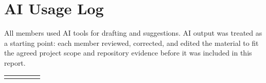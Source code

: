 \clearpage
\section{AI Usage Log}\label{ai-usage-log}

All members used AI tools for drafting and suggestions. AI output was treated
as a starting point: each member reviewed, corrected, and edited the material
to fit the agreed project scope and repository evidence before it was included
in this report.

\begin{longtable}[]{@{}
  |>{\raggedright\arraybackslash}p{}
  |>{\raggedright\arraybackslash}p{}
  |>{\raggedright\arraybackslash}p{}
  |>{\raggedright\arraybackslash}p{}
  |>{\raggedright\arraybackslash}p{}|@{}}
\hline
\rowcolor{TableBlue}


\end{longtable}
